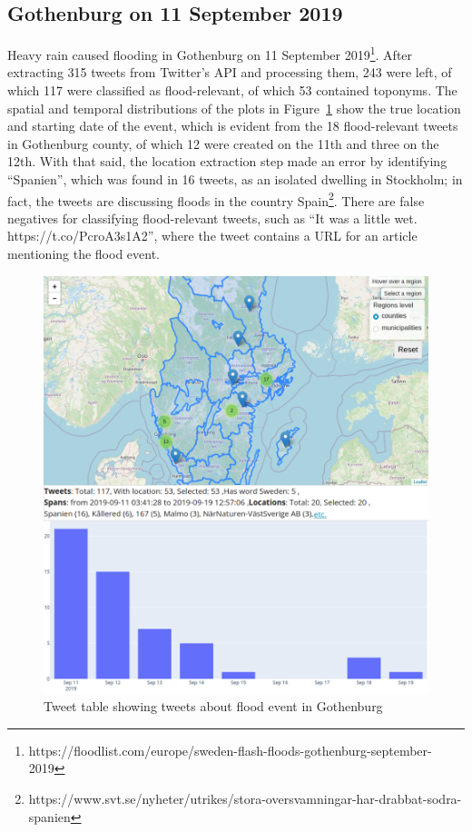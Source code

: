 \subsection{Gothenburg on 11 September 2019}

Heavy rain caused flooding in Gothenburg on 11 September
2019\footnote{https://floodlist.com/europe/sweden-flash-floods-gothenburg-september-2019}. After
extracting 315 tweets from Twitter's \ac{API} and processing them, 243 were left, of which 117 were
classified as flood-relevant, of which 53 contained toponyms. The spatial and temporal distributions
of the plots in Figure~\ref{fig:gothenburg_map} show the true location and starting date of the
event, which is evident from the 18 flood-relevant tweets in Gothenburg county, of which 12 were
created on the 11th and three on the 12th. With that said, the location extraction step made an
error by identifying ``Spanien'', which was found in 16 tweets, as an isolated dwelling in
Stockholm; in fact, the tweets are discussing floods in the country
Spain\footnote{https://www.svt.se/nyheter/utrikes/stora-oversvamningar-har-drabbat-sodra-spanien}.
There are false negatives for classifying flood-relevant tweets, such as ``It was a little wet.
https://t.co/PcroA3s1A2'', where the tweet contains a \ac{URL} for an article mentioning the flood
event.

\begin{figure}[H]
  \begin{center}
    \includegraphics[width=12cm]{./images/gothenburg_floods.png}
  \end{center}
  \caption{Tweet table  showing tweets about flood event in Gothenburg}
  \label{fig:gothenburg_map}
\end{figure}


